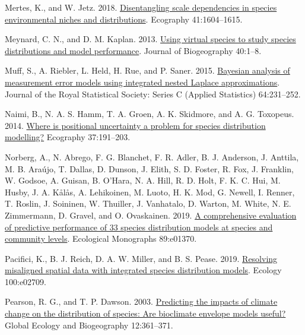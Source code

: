 \documentclass[
  12pt,
  a4paper]{article}
\newlength{\cslhangindent}
\newlength{\cslentryspacingunit} %
\newenvironment{CSLReferences}[2] %
 {%
  \setlength{\parindent}{0pt}
  \ifodd #1
  \let\oldpar\par
  \def\par{\hangindent=\cslhangindent\oldpar}
  \fi
  \setlength{\parskip}{#2\cslentryspacingunit}
 }%
 {}
\begin{document}
\begin{CSLReferences}{1}{0}
\leavevmode{}%
Mertes, K., and W. Jetz. 2018. \href{https://doi.org/10.1111/ecog.02871}{Disentangling scale dependencies in species environmental niches and distributions}. Ecography 41:1604--1615.

\leavevmode{}%
Meynard, C. N., and D. M. Kaplan. 2013. \href{https://doi.org/10.1111/jbi.12006}{Using virtual species to study species distributions and model performance}. Journal of Biogeography 40:1--8.

\leavevmode{}%
Muff, S., A. Riebler, L. Held, H. Rue, and P. Saner. 2015. \href{https://doi.org/10.1111/rssc.12069}{Bayesian analysis of measurement error models using integrated nested {Laplace} approximations}. Journal of the Royal Statistical Society: Series C (Applied Statistics) 64:231--252.

\leavevmode{}%
Naimi, B., N. A. S. Hamm, T. A. Groen, A. K. Skidmore, and A. G. Toxopeus. 2014. \href{https://doi.org/10.1111/j.1600-0587.2013.00205.x}{Where is positional uncertainty a problem for species distribution modelling?} Ecography 37:191--203.

\leavevmode{}%
Norberg, A., N. Abrego, F. G. Blanchet, F. R. Adler, B. J. Anderson, J. Anttila, M. B. Araújo, T. Dallas, D. Dunson, J. Elith, S. D. Foster, R. Fox, J. Franklin, W. Godsoe, A. Guisan, B. O'Hara, N. A. Hill, R. D. Holt, F. K. C. Hui, M. Husby, J. A. Kålås, A. Lehikoinen, M. Luoto, H. K. Mod, G. Newell, I. Renner, T. Roslin, J. Soininen, W. Thuiller, J. Vanhatalo, D. Warton, M. White, N. E. Zimmermann, D. Gravel, and O. Ovaskainen. 2019. \href{https://doi.org/10.1002/ecm.1370}{A comprehensive evaluation of predictive performance of 33 species distribution models at species and community levels}. Ecological Monographs 89:e01370.

\leavevmode{}%
Pacifici, K., B. J. Reich, D. A. W. Miller, and B. S. Pease. 2019. \href{https://doi.org/10.1002/ecy.2709}{Resolving misaligned spatial data with integrated species distribution models}. Ecology 100:e02709.

\leavevmode{}%
Pearson, R. G., and T. P. Dawson. 2003. \href{https://doi.org/10.1046/j.1466-822X.2003.00042.x}{Predicting the impacts of climate change on the distribution of species: Are bioclimate envelope models useful?} Global Ecology and Biogeography 12:361--371.


\end{CSLReferences}
\end{document}
